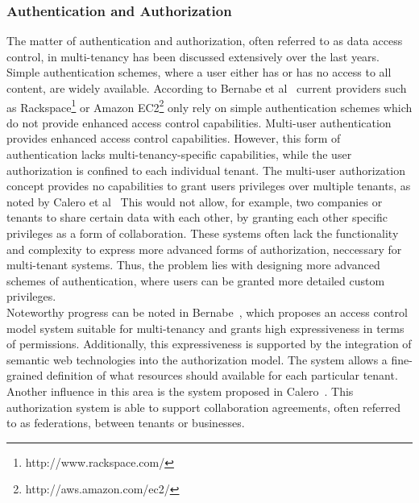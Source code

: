 \subsubsection{Authentication and Authorization}
The matter of authentication and authorization, often referred to as data access control, in multi-tenancy has been discussed extensively over the last years. 
Simple authentication schemes, where a user either has or has no access to all content, are widely available.
According to Bernabe et al~\cite{Bernabe2012Auth} current providers such as Rackspace\footnote{http://www.rackspace.com/} or Amazon EC2\footnote{http://aws.amazon.com/ec2/} only rely on simple authentication schemes which do not provide enhanced access control capabilities. 
Multi-user authentication provides enhanced access control capabilities.
However, this form of authentication lacks multi-tenancy-specific capabilities, while the user authorization is confined to each individual tenant. 
The multi-user authorization concept provides no capabilities to grant users privileges over multiple tenants, as noted by Calero et al~\cite{Calero2010Auth}
This would not allow, for example, two companies or tenants to share certain data with each other, by granting each other specific privileges as a form of collaboration.
These systems often lack the functionality and complexity to express more advanced forms of authorization, neccessary for multi-tenant systems.
Thus, the problem lies with designing more advanced schemes of authentication, where users can be granted more detailed custom privileges.\\

Noteworthy progress can be noted in Bernabe~\cite{Bernabe2012Auth}, which proposes an access control model system suitable for multi-tenancy and grants high expressiveness in terms of permissions. 
Additionally, this expressiveness is supported by the integration of semantic web technologies into the authorization model. 
The system allows a fine-grained definition of what resources should available for each particular tenant. 
Another influence in this area is the system proposed in Calero~\cite{Calero2010Auth}. 
This authorization system is able to support collaboration agreements, often referred to as federations, between tenants or businesses.

